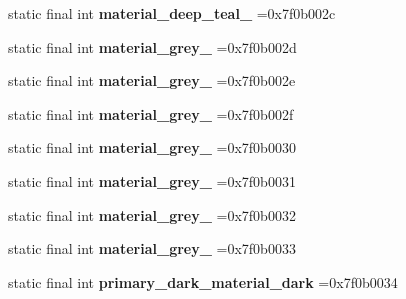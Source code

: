 \begin{DoxyCompactItemize}
\item 
\hypertarget{classcheck_1_1test_1_1_r_1_1color_a5f049fda3012191872a68ad7878616ae}{}static final int {\bfseries material\+\_\+deep\+\_\+teal\+\_} =0x7f0b002c\label{classcheck_1_1test_1_1_r_1_1color_a5f049fda3012191872a68ad7878616ae}

\item 
\hypertarget{classcheck_1_1test_1_1_r_1_1color_a3ac16740f7d6a8cdabf784d93a4dad6d}{}static final int {\bfseries material\+\_\+grey\+\_} =0x7f0b002d\label{classcheck_1_1test_1_1_r_1_1color_a3ac16740f7d6a8cdabf784d93a4dad6d}

\item 
\hypertarget{classcheck_1_1test_1_1_r_1_1color_a5eff55eba6472ca4e9d8d80ccd6e0b7d}{}static final int {\bfseries material\+\_\+grey\+\_} =0x7f0b002e\label{classcheck_1_1test_1_1_r_1_1color_a5eff55eba6472ca4e9d8d80ccd6e0b7d}

\item 
\hypertarget{classcheck_1_1test_1_1_r_1_1color_a0766a2dada246d500bf80b5d124add45}{}static final int {\bfseries material\+\_\+grey\+\_} =0x7f0b002f\label{classcheck_1_1test_1_1_r_1_1color_a0766a2dada246d500bf80b5d124add45}

\item 
\hypertarget{classcheck_1_1test_1_1_r_1_1color_aba0e0f141810cfd292f63f658c9c6d87}{}static final int {\bfseries material\+\_\+grey\+\_} =0x7f0b0030\label{classcheck_1_1test_1_1_r_1_1color_aba0e0f141810cfd292f63f658c9c6d87}

\item 
\hypertarget{classcheck_1_1test_1_1_r_1_1color_a89aee5801aa0fb3eda6d21008a8bbda0}{}static final int {\bfseries material\+\_\+grey\+\_} =0x7f0b0031\label{classcheck_1_1test_1_1_r_1_1color_a89aee5801aa0fb3eda6d21008a8bbda0}

\item 
\hypertarget{classcheck_1_1test_1_1_r_1_1color_a2f237a541144a9fe7f1ac67e27ba6645}{}static final int {\bfseries material\+\_\+grey\+\_} =0x7f0b0032\label{classcheck_1_1test_1_1_r_1_1color_a2f237a541144a9fe7f1ac67e27ba6645}

\item 
\hypertarget{classcheck_1_1test_1_1_r_1_1color_a06caffa71eeb689cc9b0e9462aa59866}{}static final int {\bfseries material\+\_\+grey\+\_} =0x7f0b0033\label{classcheck_1_1test_1_1_r_1_1color_a06caffa71eeb689cc9b0e9462aa59866}

\item 
\hypertarget{classcheck_1_1test_1_1_r_1_1color_adc4839523a256b8789a8eeb2af0df3f7}{}static final int {\bfseries primary\+\_\+dark\+\_\+material\+\_\+dark} =0x7f0b0034\label{classcheck_1_1test_1_1_r_1_1color_adc4839523a256b8789a8eeb2af0df3f7}


\end{DoxyCompactItemize}
